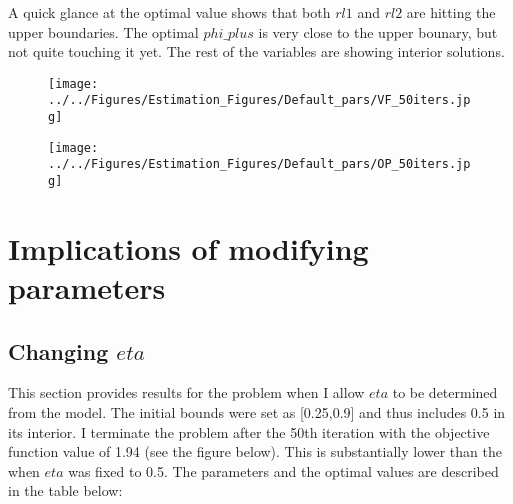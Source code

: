 \documentclass{../cls/NotesV2_Class}
\begin{document}
A quick glance at the optimal value shows that both $rl1$ and $rl2$ are hitting the upper boundaries. The optimal $phi\_plus$ is very close to the upper bounary, but not quite touching it yet. The rest of the variables are showing interior solutions.

\begin{figure}[htbp!]
\texttt{[image: ../../Figures/Estimation\_Figures/Default\_pars/VF\_50iters.jpg]}
\end{figure}

\begin{figure}[htbp!]
\texttt{[image: ../../Figures/Estimation\_Figures/Default\_pars/OP\_50iters.jpg]}
\end{figure}

\section{Implications of modifying parameters}\label{July23Meeting}
\subsection{Changing $eta$}
This section provides results for the problem when I allow $eta$ to be determined from the model. The initial bounds were set as [0.25,0.9] and thus includes 0.5 in its interior. I terminate the problem after the 50th iteration with the objective function value of 1.94 (see the figure below). This is substantially lower than the when $eta$ was fixed to 0.5. The parameters and the optimal values are described in the table below:
\end{document}
